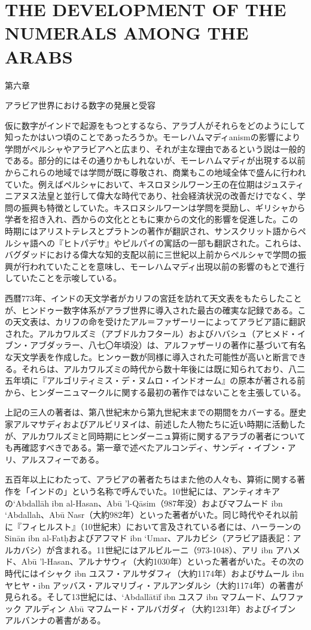 \documentclass[a4paper,11pt,openany]{ltjsbook}
\begin{document}
\section*{THE DEVELOPMENT OF THE NUMERALS AMONG THE ARABS}

第六章

アラビア世界における数字の発展と受容

仮に数字がインドで起源をもつとするなら、アラブ人がそれらをどのようにして知ったかはいつ頃のことであったろうか。モーレハムマディanismの影響により学問がペルシャやアラビアへと広まり、それが主な理由であるという説は一般的である。部分的にはその通りかもしれないが、モーレハムマディが出現する以前からこれらの地域では学問が既に尊敬され、商業もこの地域全体で盛んに行われていた。例えばペルシャにおいて、キスロヌシルワーン王の在位期はジュスティニアヌス法皇と並行して偉大な時代であり、社会経済状況の改善だけでなく、学問の振興も特徴としていた。キスロヌシルワーンは学問を奨励し、ギリシャから学者を招き入れ、西からの文化とともに東からの文化的影響を促進した。この時期にはアリストテレスとプラトンの著作が翻訳され、サンスクリット語からペルシャ語への『ヒトパデサ』やピルパイの寓話の一部も翻訳された。これらは、バグダッドにおける偉大な知的支配以前に三世紀以上前からペルシャで学問の振興が行われていたことを意味し、モーレハムマディ出現以前の影響のもとで進行していたことを示唆している。

西暦773年、インドの天文学者がカリフの宮廷を訪れて天文表をもたらしたことが、ヒンドゥー数字体系がアラブ世界に導入された最古の確実な記録である。この天文表は、カリフの命を受けたアル＝ファザーリーによってアラビア語に翻訳された。アルカワルズミ（アブドルカフタール）およびハバシュ（アヒメド・イブン・アブダッラー、八七〇年頃没）は、アルファザーリの著作に基づいて有名な天文学表を作成した。ヒンゥー数が同様に導入された可能性が高いと断言できる。それらは、アルカワルズミの時代から数十年後には既に知られており、八二五年頃に『アルゴリティミス・デ・ヌムロ・インドオーム』の原本が著される前から、ヒンダーニュマークルに関する最初の著作ではないことを主張している。

上記の三人の著者は、第八世紀末から第九世紀末までの期間をカバーする。歴史家アルマサディおよびアルビリヌイは、前述した人物たちに近い時期に活動したが、アルカワルズミと同時期にヒンダーニュ算術に関するアラブの著者についても再確認すべきである。第一章で述べたアルコンディ、サンディ・イブン・アリ、アルスフィーである。

五百年以上にわたって、アラビアの著者たちはまた他の人々も、算術に関する著作を「インドの」という名称で呼んでいた。10世紀には、アンティオキアの`Abdallāh ibn al-Hasan、Abū 'l-Qāsim（987年没）およびマフムード ibn `Abdallah、Abū Nasr（大約982年）といった著者がいた。同じ時代やそれ以前に『フィヒルスト』（10世紀末）において言及されている者には、ハーラーンのSinān ibn al-Fatḥおよびアフマド ibn `Umar、アルカビシ（アラビア語表記：アルカバシ）が含まれる。11世紀にはアルビルーニ（973-1048）、アリ ibn アハメド、Abū 'l-Hasan、アルナサウィ（大約1030年）といった著者がいた。その次の時代にはイシャク ibn ユスフ・アルサダフィ（大約1174年）およびサムール ibn ヤヒヤ・ibn アッバス・アルマリブィ・アルアンダルシ（大約1174年）の著書が見られる。そして13世紀には、`Abdallātīf ibn ユスフ ibn マフムード、ムワファック アルディン Abū マフムード・アルバガダィ（大約1231年）およびイブン アルバンナの著書がある。
\end{document}

